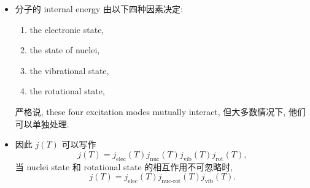 \begin{itemize}
	\item 分子的 internal energy 由以下四种因素决定:
	\begin{enumerate}
		\item the electronic state,
		
		\item the state of nuclei,
		
		\item the vibrational state,
		
		\item the rotational state,
	\end{enumerate}
	严格说, these four excitation modes mutually interact, 但大多数情况下, 他们可以单独处理.
	
	\item 因此 $j(T)$ 可以写作
	\begin{equation}
		j(T) = j_\text{elec}(T) j_\text{nuc}(T) j_\text{vib}(T) j_\text{rot}(T),
	\end{equation}
	当 nuclei state 和 rotational state 的相互作用不可忽略时,
	\begin{equation}
		j(T) = j_\text{elec}(T) j_\text{nuc-rot}(T) j_\text{vib}(T).
	\end{equation}
\end{itemize}

